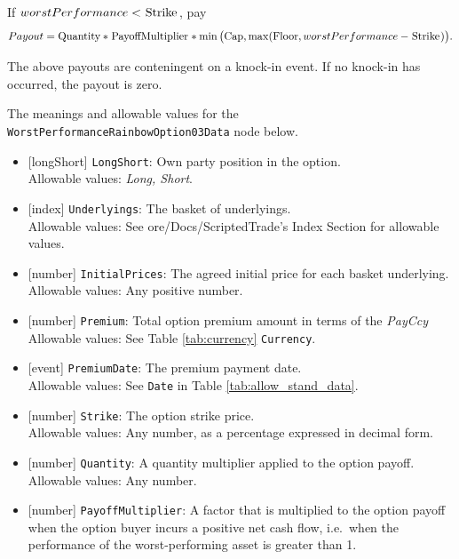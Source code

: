 If $worstPerformance < \text{\lstinline!Strike!}$, pay
\begin{equation*}
  Payout = \text{\lstinline!Quantity!} * \text{\lstinline!PayoffMultiplier!} * \min\big(\text{\lstinline!Cap!}, \max(\text{\lstinline!Floor!}, worstPerformance - \text{\lstinline!Strike!})\big).
\end{equation*}

The above payouts are conteningent on a knock-in event. If no knock-in has occurred, the payout is zero.

The meanings and allowable values for the \lstinline!WorstPerformanceRainbowOption03Data! node below.

\begin{itemize}
  \item{}[longShort] \lstinline!LongShort!: Own party position in the option. \\
  Allowable values: \emph{Long, Short}.
  \item{}[index] \lstinline!Underlyings!: The basket of underlyings. \\
  Allowable values: See ore/Docs/ScriptedTrade's Index Section for allowable values.
  \item{}[number] \lstinline!InitialPrices!: The agreed initial price for each basket underlying. \\
  Allowable values: Any positive number.
  \item{}[number] \lstinline!Premium!: Total option premium amount in terms of the \emph{PayCcy} \\
  Allowable values: See Table \ref{tab:currency} \lstinline!Currency!.
  \item{}[event] \lstinline!PremiumDate!: The premium payment date. \\
  Allowable values: See \lstinline!Date! in Table \ref{tab:allow_stand_data}.
  \item{}[number] \lstinline!Strike!: The option strike price. \\
  Allowable values: Any number, as a percentage expressed in decimal form.
  \item{}[number] \lstinline!Quantity!: A quantity multiplier applied to the option payoff. \\
  Allowable values: Any number.
  \item{}[number] \lstinline!PayoffMultiplier!: A factor that is multiplied to the option payoff when the option buyer incurs
  a positive net cash flow, i.e.\ when the performance of the worst-performing asset is greater than 1. \\

\end{itemize}
